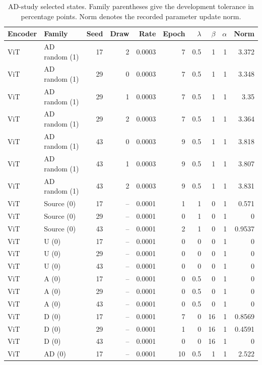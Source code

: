 \begin{table}[t]
\centering
\scriptsize
\setlength{\tabcolsep}{3pt}
\begin{tabular}{llrrrrrrrr}
\toprule
Encoder & Family & Seed & Draw & Rate & Epoch & $\lambda$ & $\beta$ & $\alpha$ & Norm\\
\midrule
ViT & AD random (1) & 17 & 2 & 0.0003 & 7 & 0.5 & 1 & 1 & 3.372\\
ViT & AD random (1) & 29 & 0 & 0.0003 & 7 & 0.5 & 1 & 1 & 3.348\\
ViT & AD random (1) & 29 & 1 & 0.0003 & 7 & 0.5 & 1 & 1 & 3.35\\
ViT & AD random (1) & 29 & 2 & 0.0003 & 7 & 0.5 & 1 & 1 & 3.364\\
ViT & AD random (1) & 43 & 0 & 0.0003 & 9 & 0.5 & 1 & 1 & 3.818\\
ViT & AD random (1) & 43 & 1 & 0.0003 & 9 & 0.5 & 1 & 1 & 3.807\\
ViT & AD random (1) & 43 & 2 & 0.0003 & 9 & 0.5 & 1 & 1 & 3.831\\
ViT & Source (0) & 17 & -- & 0.0001 & 1 & 1 & 0 & 1 & 0.571\\
ViT & Source (0) & 29 & -- & 0.0001 & 0 & 1 & 0 & 1 & 0\\
ViT & Source (0) & 43 & -- & 0.0001 & 2 & 1 & 0 & 1 & 0.9537\\
ViT & U (0) & 17 & -- & 0.0001 & 0 & 0 & 0 & 1 & 0\\
ViT & U (0) & 29 & -- & 0.0001 & 0 & 0 & 0 & 1 & 0\\
ViT & U (0) & 43 & -- & 0.0001 & 0 & 0 & 0 & 1 & 0\\
ViT & A (0) & 17 & -- & 0.0001 & 0 & 0.5 & 0 & 1 & 0\\
ViT & A (0) & 29 & -- & 0.0001 & 0 & 0.5 & 0 & 1 & 0\\
ViT & A (0) & 43 & -- & 0.0001 & 0 & 0.5 & 0 & 1 & 0\\
ViT & D (0) & 17 & -- & 0.0001 & 7 & 0 & 16 & 1 & 0.8569\\
ViT & D (0) & 29 & -- & 0.0001 & 1 & 0 & 16 & 1 & 0.4591\\
ViT & D (0) & 43 & -- & 0.0001 & 0 & 0 & 16 & 1 & 0\\
ViT & AD (0) & 17 & -- & 0.0001 & 10 & 0.5 & 1 & 1 & 2.522\\
\bottomrule
\end{tabular}
\caption{AD-study selected states. Family parentheses give the development tolerance in percentage points. Norm denotes the recorded parameter update norm.}\label{tab:adselected20}
\end{table}


